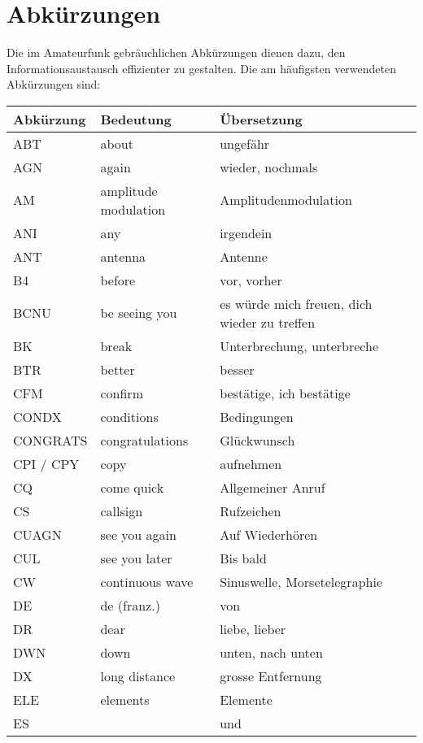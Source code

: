 \section{Abkürzungen}
Die im Amateurfunk gebräuchlichen Abkürzungen dienen dazu, den Informationsaustausch effizienter zu gestalten. Die am häufigsten verwendeten Abkürzungen sind:

{
\begin{longtabu} to \linewidth{lll}
\rowfont \bfseries Abkürzung & Bedeutung &  Übersetzung \\
\toprule
\endhead
{}
ABT & about & ungefähr \\ \midrule
AGN & again & wieder, nochmals \\ \midrule
AM & amplitude modulation & Amplitudenmodulation \\ \midrule
ANI & any & irgendein \\ \midrule
ANT & antenna & Antenne \\ \midrule
B4 & before & vor, vorher \\ \midrule
BCNU & be seeing you & es würde mich freuen, dich  wieder zu treffen \\ \midrule
BK & break & Unterbrechung, unterbreche \\ \midrule
BTR & better & besser \\ \midrule
CFM & confirm & bestätige, ich bestätige \\ \midrule
CONDX & conditions & Bedingungen \\ \midrule
CONGRATS & congratulations & Glückwunsch \\ \midrule
CPI / CPY & copy & aufnehmen \\ \midrule
CQ & come quick & Allgemeiner Anruf \\ \midrule
CS & callsign & Rufzeichen \\ \midrule
CUAGN & see you again & Auf Wiederhören \\ \midrule
CUL & see you later & Bis bald \\ \midrule
CW & continuous wave & Sinuswelle, Morsetelegraphie \\ \midrule
DE & de (franz.) & von \\ \midrule
DR & dear & liebe, lieber \\ \midrule
DWN & down & unten, nach unten \\ \midrule
DX & long distance & grosse Entfernung \\ \midrule
ELE & elements & Elemente \\ \midrule
ES &  & und \\ \midrule

\end{longtabu}}
